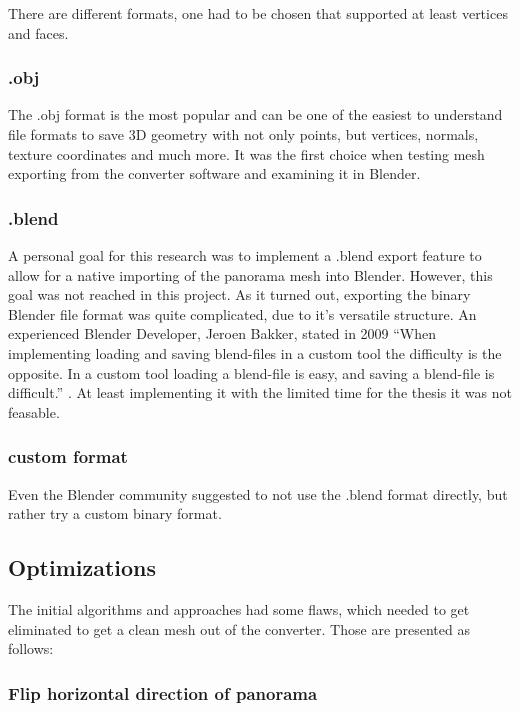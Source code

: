 There are different formats, one had to be chosen that supported at least vertices and faces.

\subsubsection{.obj}

The .obj format is the most popular and can be one of the easiest to understand file formats to save 3D geometry with not only points, but vertices, normals, texture coordinates and much more. It was the first choice when testing mesh exporting from the converter software and examining it in Blender.

\subsubsection{.blend}

A personal goal for this research was to implement a .blend export feature to allow for a native importing of the panorama mesh into Blender. However, this goal was not reached in this project. As it turned out, exporting the binary Blender file format was quite complicated, due to it's versatile structure. An experienced Blender Developer, Jeroen Bakker, stated in 2009 “When implementing loading and saving blend-files in a custom tool the difficulty is the opposite. In a custom tool loading a blend-file is easy, and saving a blend-file is difficult.” \parencite[see]{webMysteryOfTheBlend}. At least implementing it with the limited time for the thesis it was not feasable.



\subsubsection{custom format}

Even the Blender community suggested to not use the .blend format directly, but rather try a custom binary format. \parencite[compare]{webBlenderArtistsBlendExport}


\subsection{Optimizations}

The initial algorithms and approaches had some flaws, which needed to get eliminated to get a clean mesh out of the converter. Those are presented as follows:

\subsubsection{Flip horizontal direction of panorama}

